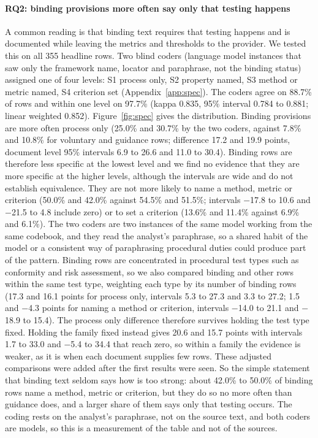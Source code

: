 \documentclass[conference]{IEEEtran}
\begin{document}
\paragraph{RQ2: binding provisions more often say only that testing happens} A common reading is that binding text requires that testing happens and is documented while leaving the metrics and thresholds to the provider. We tested this on all 355 headline rows. Two blind coders (language model instances that saw only the framework name, locator and paraphrase, not the binding status) assigned one of four levels: S1 process only, S2 property named, S3 method or metric named, S4 criterion set (Appendix~\ref{app:spec}). The coders agree on 88.7\% of rows and within one level on 97.7\% (kappa 0.835, 95\% interval 0.784 to 0.881; linear weighted 0.852). Figure~\ref{fig:spec} gives the distribution. Binding provisions are more often process only (25.0\% and 30.7\% by the two coders, against 7.8\% and 10.8\% for voluntary and guidance rows; difference 17.2 and 19.9 points, document level 95\% intervals 6.9 to 26.6 and 11.0 to 30.4). Binding rows are therefore less specific at the lowest level and we find no evidence that they are more specific at the higher levels, although the intervals are wide and do not establish equivalence. They are not more likely to name a method, metric or criterion (50.0\% and 42.0\% against 54.5\% and 51.5\%; intervals $-$17.8 to 10.6 and $-$21.5 to 4.8 include zero) or to set a criterion (13.6\% and 11.4\% against 6.9\% and 6.1\%). The two coders are two instances of the same model working from the same codebook, and they read the analyst's paraphrase, so a shared habit of the model or a consistent way of paraphrasing procedural duties could produce part of the pattern. Binding rows are concentrated in procedural test types such as conformity and risk assessment, so we also compared binding and other rows within the same test type, weighting each type by its number of binding rows (17.3 and 16.1 points for process only, intervals 5.3 to 27.3 and 3.3 to 27.2; 1.5 and $-$4.3 points for naming a method or criterion, intervals $-$14.0 to 21.1 and $-$18.9 to 15.4). The process only difference therefore survives holding the test type fixed. Holding the family fixed instead gives 20.6 and 15.7 points with intervals 1.7 to 33.0 and $-$5.4 to 34.4 that reach zero, so within a family the evidence is weaker, as it is when each document supplies few rows. These adjusted comparisons were added after the first results were seen. So the simple statement that binding text seldom says how is too strong: about 42.0\% to 50.0\% of binding rows name a method, metric or criterion, but they do so no more often than guidance does, and a larger share of them says only that testing occurs. The coding rests on the analyst's paraphrase, not on the source text, and both coders are models, so this is a measurement of the table and not of the sources.
\end{document}
